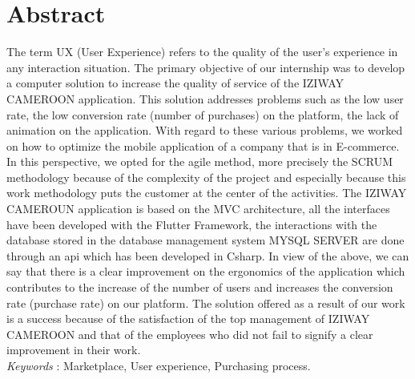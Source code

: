 \chapter*{Abstract}                      %
\thispagestyle{fancy}
\vspace{-2cm}
The term UX (User Experience) refers to the quality of the user's experience in any interaction situation. The primary objective of our internship was to develop a computer solution to increase the quality of service of the IZIWAY CAMEROON application. This solution addresses problems such as the low user rate, the low conversion rate (number of purchases) on the platform, the lack of animation on the application. With regard to these various problems, we worked on how to optimize the mobile application of a company that is in E-commerce. In this perspective, we opted for the agile method, more precisely the SCRUM methodology because of the complexity of the project and especially because this work methodology puts the customer at the center of the activities.  The IZIWAY CAMEROUN application is based on the MVC architecture, all the interfaces have been developed with the Flutter Framework, the interactions with the database stored in the database management system MYSQL SERVER are done through an api which has been developed in Csharp. In view of the above, we can say that there is a clear improvement on the ergonomics of the application which contributes to the increase of the number of users and increases the conversion rate (purchase rate) on our platform. The solution offered as a result of our work is a success because of the satisfaction of the top management of IZIWAY CAMEROON and that of the employees who did not fail to signify a clear improvement in their work.\\


\textit{Keywords} : Marketplace, User experience, Purchasing process.